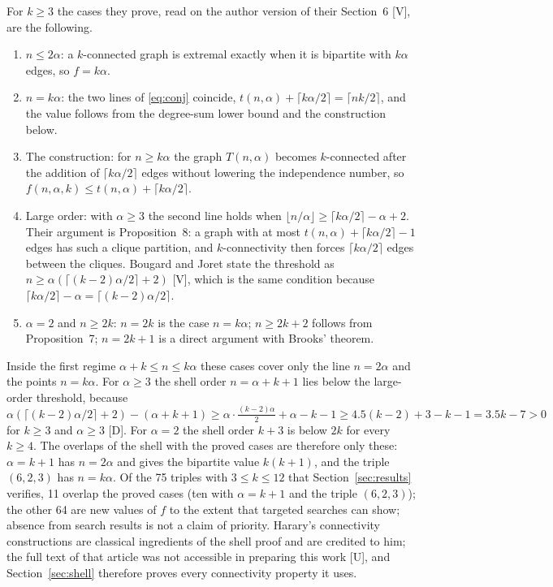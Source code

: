 For $k\ge3$ the cases they prove, read on the author version of their Section~6 [V], are the following.
\begin{enumerate}
\item $n\le2\alpha$: a $k$-connected graph is extremal exactly when it is bipartite with $k\alpha$ edges, so $f=k\alpha$.
\item $n=k\alpha$: the two lines of \eqref{eq:conj} coincide, $t(n,\alpha)+\lceil k\alpha/2\rceil=\lceil nk/2\rceil$, and the value follows from the degree-sum lower bound and the construction below.
\item The construction: for $n\ge k\alpha$ the graph $T(n,\alpha)$ becomes $k$-connected after the addition of $\lceil k\alpha/2\rceil$ edges without lowering the independence number, so $f(n,\alpha,k)\le t(n,\alpha)+\lceil k\alpha/2\rceil$.
\item Large order: with $\alpha\ge3$ the second line holds when $\lfloor n/\alpha\rfloor\ge\lceil k\alpha/2\rceil-\alpha+2$. Their argument is Proposition~8: a graph with at most $t(n,\alpha)+\lceil k\alpha/2\rceil-1$ edges has such a clique partition, and $k$-connectivity then forces $\lceil k\alpha/2\rceil$ edges between the cliques. Bougard and Joret state the threshold as $n\ge\alpha(\lceil(k-2)\alpha/2\rceil+2)$ [V], which is the same condition because $\lceil k\alpha/2\rceil-\alpha=\lceil(k-2)\alpha/2\rceil$.
\item $\alpha=2$ and $n\ge2k$: $n=2k$ is the case $n=k\alpha$; $n\ge2k+2$ follows from Proposition~7; $n=2k+1$ is a direct argument with Brooks' theorem.
\end{enumerate}
Inside the first regime $\alpha+k\le n\le k\alpha$ these cases cover only the line $n=2\alpha$ and the points $n=k\alpha$.
For $\alpha\ge3$ the shell order $n=\alpha+k+1$ lies below the large-order threshold, because $\alpha(\lceil(k-2)\alpha/2\rceil+2)-(\alpha+k+1)\ge\alpha\cdot\frac{(k-2)\alpha}2+\alpha-k-1\ge4.5(k-2)+3-k-1=3.5k-7>0$ for $k\ge3$ and $\alpha\ge3$ [D].
For $\alpha=2$ the shell order $k+3$ is below $2k$ for every $k\ge4$.
The overlaps of the shell with the proved cases are therefore only these: $\alpha=k+1$ has $n=2\alpha$ and gives the bipartite value $k(k+1)$, and the triple $(6,2,3)$ has $n=k\alpha$.
Of the 75 triples with $3\le k\le12$ that Section~\ref{sec:results} verifies, 11 overlap the proved cases (ten with $\alpha=k+1$ and the triple $(6,2,3)$); the other 64 are new values of $f$ to the extent that targeted searches can show; absence from search results is not a claim of priority.
Harary's connectivity constructions \cite{Harary} are classical ingredients of the shell proof and are credited to him; the full text of that article was not accessible in preparing this work [U], and Section~\ref{sec:shell} therefore proves every connectivity property it uses.

